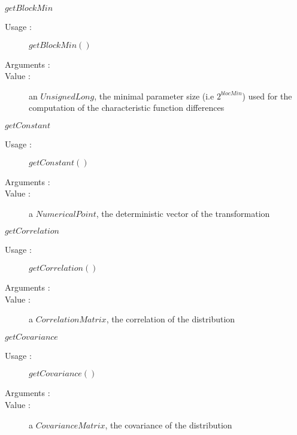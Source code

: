 \begin{description}
\begin{description}
  \item $getBlockMin$
    \begin{description}
    \item[Usage :]  $getBlockMin()$
    \item[Arguments :]  \strut
    \item[Value :] an $UnsignedLong$, the minimal parameter size (i.e $2^{blocMin}$) used for the computation of the characteristic function differences
    \end{description}

  \item $getConstant$
    \begin{description}
    \item[Usage :]  $getConstant()$
    \item[Arguments :]  \strut
    \item[Value :] a $NumericalPoint$, the deterministic vector of the transformation
    \end{description}

  \item $getCorrelation$
    \begin{description}
    \item[Usage :]  $getCorrelation()$
    \item[Arguments :]  \strut
    \item[Value :] a $CorrelationMatrix$, the correlation of the distribution
    \end{description}

  \item $getCovariance$
    \begin{description}
    \item[Usage :]  $getCovariance()$
    \item[Arguments :]  \strut
    \item[Value :] a $CovarianceMatrix$, the covariance of the distribution
    \end{description}


\end{description}
\end{description}
